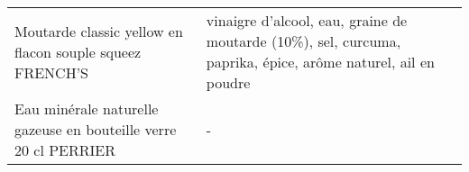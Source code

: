 \begin{longtable}{p{5cm}p{10cm}}
                                                 Moutarde classic yellow en flacon souple squeez FRENCH'S &                                                                                                                                                                                                                                                                                                                                                                                                                                                                                                                                                                                                                                                                                                                                                                                                                                                                                                                             vinaigre d'alcool, eau, graine de moutarde (10\%), sel, curcuma, paprika, épice, arôme naturel, ail en poudre \\
                                          Eau minérale naturelle gazeuse en bouteille verre 20 cl PERRIER &                                                                                                                                                                                                                                                                                                                                                                                                                                                                                                                                                                                                                                                                                                                                                                                                                                                                                                                                                                                                                                        - \\

\end{longtable}
